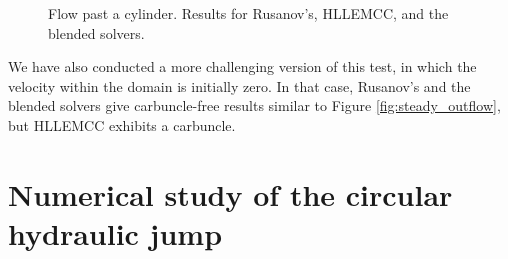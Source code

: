 \documentclass[preprint, 11pt]{article}
\begin{document}
\begin{figure}[!h]
{    
  }
  \caption{
    Flow past a cylinder.  Results for Rusanov's, HLLEMCC, and the blended solvers.
    \label{fig:cylinder_flow}}
\end{figure}

We have also conducted a more challenging version of this test, in which
the velocity within the domain is initially zero.  In that case, Rusanov's 
and the blended solvers give carbuncle-free results similar to Figure \ref{fig:steady_outflow},
but HLLEMCC exhibits a carbuncle.

\section{Numerical study of the circular hydraulic jump}\label{sec:chj}
\end{document}
